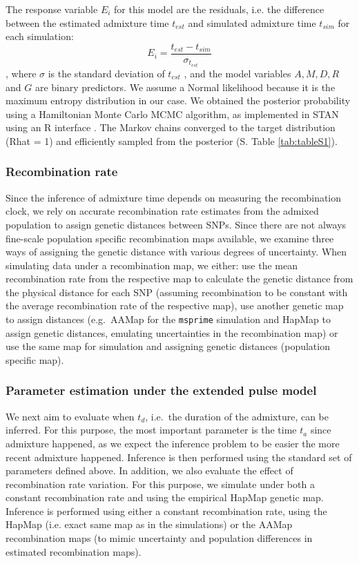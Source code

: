 \documentclass[]{article}
\begin{document}
The response variable $E_i$ for this model are the residuals, i.e. the difference between the estimated admixture time $t_{est}$ and simulated admixture time $t_{sim}$ for each simulation:
$$E_i = \frac{t_{est} - t_{sim}}{\sigma_{t_{est}}}$$, where $\sigma$ is the standard deviation of $t_{est}$ , and the model variables $A, M, D, R$ and $G$ are binary predictors.
We assume a Normal likelihood because it is the maximum entropy distribution in our case. We obtained the posterior probability using a Hamiltonian Monte Carlo MCMC algorithm, as implemented in STAN \citep{carpenter_stan_2017} using an R interface \citep{stan_development_team_rstan_2018,mcelreath_statistical_2020}. The Markov chains converged to the target distribution (Rhat = 1) and efficiently sampled from the posterior (S. Table \ref{tab:tableS1}).  

\subsubsection{Recombination rate}
 
Since the inference of admixture time depends on measuring the recombination clock, we rely on accurate recombination rate estimates from the admixed population to assign genetic distances between SNPs. Since there are not always fine-scale population specific recombination maps available, we examine three ways of assigning the genetic distance with various degrees of uncertainty. When simulating data under a recombination map, we either: use the mean recombination rate from the
respective map to calculate the genetic distance from the physical
distance for each SNP (assuming recombination to be constant with the average recombination rate of the respective map), use another genetic map to assign distances
(e.g.~AAMap  for the \texttt{msprime} simulation and HapMap  to assign genetic distances, emulating uncertainties in the recombination map) or use the same map for simulation and assigning
genetic distances (population specific map). 

\subsubsection{Parameter estimation under the extended pulse model}
We next aim to evaluate when $t_d$, i.e.~the duration of the admixture, can be inferred.  For this purpose, the most important parameter is the time $t_{a}$ since admixture happened, as we expect the inference problem to be easier the more recent admixture happened. Inference is then performed using the standard set of parameters defined above. In addition, we also  evaluate the effect of  recombination rate variation. For this purpose, we simulate under both a constant recombination rate and using the empirical HapMap genetic map. Inference is performed using either  a constant recombination rate, using the HapMap (i.e. exact same map as in the simulations) or the AAMap recombination maps (to mimic uncertainty and population differences in estimated recombination maps). 
\end{document}
